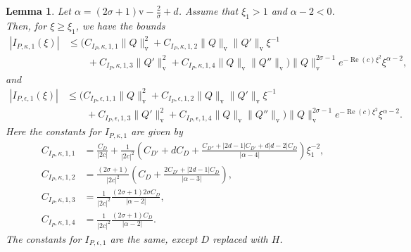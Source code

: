 \documentclass[11pt]{article}
\DeclareMathOperator{\real}{Re}
\newcommand{\normv}{\mathrm{v}}
\newtheorem{lemma}[definition]{Lemma}
\begin{document}
\begin{lemma}\label{lemma:I-P-dkappa-depsilon-1}
  Let \(\alpha = (2\sigma + 1)\normv - \frac{2}{\sigma} + d\). Assume
  that \(\xi_{1} > 1\) and \(\alpha - 2 < 0\). Then, for
  \(\xi \geq \xi_{1}\), we have the bounds
  \begin{align*}
    \left|I_{P,\kappa,1}(\xi)\right|
    &\leq \Big(
      C_{I_{P},\kappa,1,1}\|Q\|_{\normv}^{2}
      + C_{I_{P},\kappa,1,2}\|Q\|_{\normv}\|Q'\|_{\normv}\xi^{-1}\\
    &\qquad+ C_{I_{P},\kappa,1,3}\|Q'\|_{\normv}^{2}
      + C_{I_{P},\kappa,1,4}\|Q\|_{\normv}\|Q''\|_{\normv}
      \Big)\|Q\|_{\normv}^{2\sigma - 1}e^{-\real(c)\xi^{2}}\xi^{\alpha - 2},
  \end{align*}
  and
  \begin{align*}
    \left|I_{P,\epsilon,1}(\xi)\right|
    &\leq \Big(
      C_{I_{P},\epsilon,1,1}\|Q\|_{\normv}^{2}
      + C_{I_{P},\epsilon,1,2}\|Q\|_{\normv}\|Q'\|_{\normv}\xi^{-1}\\
    &\qquad+ C_{I_{P},\epsilon,1,3}\|Q'\|_{\normv}^{2}
      + C_{I_{P},\epsilon,1,4}\|Q\|_{\normv}\|Q''\|_{\normv}
      \Big)\|Q\|_{\normv}^{2\sigma - 1}e^{-\real(c)\xi^{2}}\xi^{\alpha - 2}.
  \end{align*}
  Here the constants for \(I_{P,\kappa,1}\) are given by
  \begin{align*}
    C_{I_{P},\kappa,1,1}
    &= \frac{C_{D}}{|2c|} + \frac{1}{|2c|^{2}}\left(C_{D'} + dC_{D} + \frac{
      C_{D''} + |2d - 1|C_{D'} + d|d - 2|C_{D}
      }{
      |\alpha - 4|
      }\right)\xi_{1}^{-2},\\
    C_{I_{P},\kappa,1,2}
    &= \frac{(2\sigma + 1)}{|2c|^{2}}\left(
      C_{D} + \frac{
      2C_{D'} + |2d - 1|C_{D}
      }{
      |\alpha - 3|
      }
      \right),\\
    C_{I_{P},\kappa,1,3}
    &= \frac{1}{|2c|^{2}}\frac{(2\sigma + 1)2\sigma C_{D}}{|\alpha - 2|},\\
    C_{I_{P},\kappa,1,4}
    &= \frac{1}{|2c|^{2}}\frac{(2\sigma + 1)C_{D}}{|\alpha - 2|}.
  \end{align*}
  The constants for \(I_{P,\epsilon,1}\) are the same, except \(D\)
  replaced with \(H\).
\end{lemma}
\end{document}
